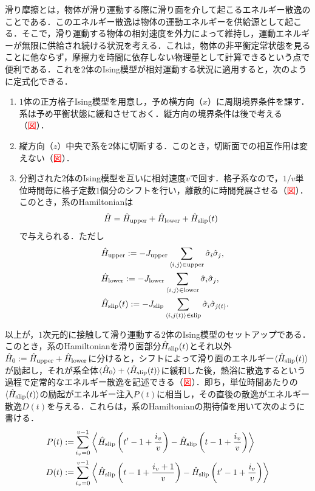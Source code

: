 \documentclass[a4paper]{jsarticle}
\begin{document}
	滑り摩擦とは，物体が滑り運動する際に滑り面を介して起こるエネルギー散逸のことである．このエネルギー散逸は物体の運動エネルギーを供給源として起こる．そこで，滑り運動する物体の相対速度を外力によって維持し，運動エネルギーが無限に供給され続ける状況を考える．これは，物体の非平衡定常状態を見ることに他ならず，摩擦力を時間に依存しない物理量として計算できるという点で便利である．これを2体のIsing模型が相対運動する状況に適用すると，次のように定式化できる．
	\begin{enumerate}
		\item $1$体の正方格子Ising模型を用意し，予め横方向（$x$）に周期境界条件を課す．系は予め平衡状態に緩和させておく．縦方向の境界条件は後で考える（\textcolor{red}{図}）．
		\item 縦方向（$z$）中央で系を$2$体に切断する．このとき，切断面での相互作用は変えない（\textcolor{red}{図}）．
		\item 分割された$2$体のIsing模型を互いに相対速度$v$で回す．格子系なので，$1/v$単位時間毎に格子定数$1$個分のシフトを行い，離散的に時間発展させる（\textcolor{red}{図}）．このとき，系のHamiltonianは
		\begin{align}
		&\hat{H}=\hat{H}_{\rm upper} + \hat{H}_{\rm lower} + \hat{H}_{\rm slip}(t)
		\end{align}
		で与えられる．ただし
		\begin{align}
		&\hat{H}_{\rm upper}:=-J_{\rm upper}\sum_{\langle i,j\rangle\in\mathrm{upper}}\hat{\sigma}_{i}\hat{\sigma}_{j}, \\
		&\hat{H}_{\rm lower}:=-J_{\rm lower}\sum_{\langle i,j\rangle\in\mathrm{lower}}\hat{\sigma}_{i}\hat{\sigma}_{j}, \\
		&\hat{H}_{\rm slip}(t):=-J_{\rm slip}\sum_{\langle i,j(t)\rangle\in\mathrm{slip}}\hat{\sigma}_{i}\hat{\sigma}_{j(t)}.
		\end{align}
	\end{enumerate}
	以上が，$1$次元的に接触して滑り運動する$2$体のIsing模型のセットアップである．このとき，系のHamiltonianを滑り面部分$\hat{H}_{\rm slip}(t)$とそれ以外$\hat{H}_{0}:=\hat{H}_{\rm upper} + \hat{H}_{\rm lower}$に分けると，シフトによって滑り面のエネルギー$\langle\hat{H}_{\rm slip}(t)\rangle$が励起し，それが系全体$\langle\hat{H}_{0}\rangle + \langle\hat{H}_{\rm slip}(t)\rangle$に緩和した後，熱浴に散逸するという過程で定常的なエネルギー散逸を記述できる（\textcolor{red}{図}）．即ち，単位時間あたりの$\langle\hat{H}_{\rm slip}(t)\rangle$の励起がエネルギー注入$P(t)$に相当し，その直後の散逸がエネルギー散逸$D(t)$を与える．これらは，系のHamiltonianの期待値を用いて次のように書ける．
	\begin{align}
	P(t):=&\sum_{i_{v}=0}^{v-1}\left\langle \hat{H}_{\rm slip}\left(t'-1+\frac{i_{v}}{v}\right) - \hat{H}_{\rm slip}\left(t-1+\frac{i_{v}}{v}\right)\right\rangle\\
	D(t):=&\sum_{i_{v}=0}^{v-1}\left\langle \hat{H}_{\rm slip}\left(t-1+\frac{i_{v}+1}{v}\right) - \hat{H}_{\rm slip}\left(t'-1+\frac{i_{v}}{v}\right)\right\rangle
	\end{align}
	
\end{document}
